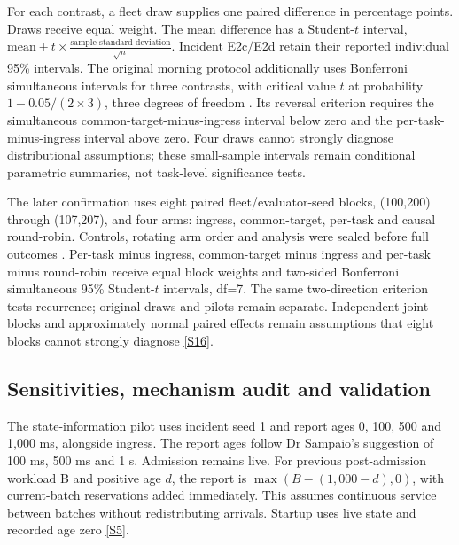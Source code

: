 \documentclass[12pt,a4paper]{article}
\begin{document}
For each contrast, a fleet draw supplies one paired difference in percentage points. Draws receive equal weight. The mean difference has a Student-$t$ interval, $\text{mean}\pm t\times\frac{\text{sample standard deviation}}{\sqrt{n}}$. Incident E2c/E2d retain their reported individual 95\% intervals. The original morning protocol additionally uses Bonferroni simultaneous intervals for three contrasts, with critical value $t$ at probability $1-0.05/(2\times 3)$, three degrees of freedom \cite{ref34}. Its reversal criterion requires the simultaneous common-target-minus-ingress interval below zero and the per-task-minus-ingress interval above zero. Four draws cannot strongly diagnose distributional assumptions; these small-sample intervals remain conditional parametric summaries, not task-level significance tests.

The later confirmation uses eight paired fleet/evaluator-seed blocks, (100,200) through (107,207), and four arms: ingress, common-target, per-task and causal round-robin. Controls, rotating arm order and analysis were sealed before full outcomes \cite{ref33}. Per-task minus ingress, common-target minus ingress and per-task minus round-robin receive equal block weights and two-sided Bonferroni simultaneous 95\% Student-$t$ intervals, df=7. The same two-direction criterion tests recurrence; original draws and pilots remain separate. Independent joint blocks and approximately normal paired effects remain assumptions that eight blocks cannot strongly diagnose \hyperref[source-s16]{[S16]}.

\FloatBarrier
\subsection{Sensitivities, mechanism audit and validation}\label{sec:2.7}

The state-information pilot uses incident seed 1 and report ages 0, 100, 500 and 1,000 ms, alongside ingress. The report ages follow Dr Sampaio's suggestion of 100 ms, 500 ms and 1 s. Admission remains live. For previous post-admission workload B and positive age $d$, the report is $\max(B-(1{,}000-d),0)$, with current-batch reservations added immediately. This assumes continuous service between batches without redistributing arrivals. Startup uses live state and recorded age zero \hyperref[source-s5]{[S5]}.
\end{document}
